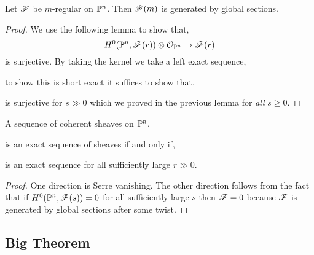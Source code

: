 \documentclass[12pt]{article}
\begin{document}
\begin{prop}
Let $\F$ be $m$-regular on $\P^n$. Then $\F(m)$ is generated by global sections.
\end{prop}

\begin{proof}
We use the following lemma to show that,
\[ H^0(\P^n, \F(r)) \ot \struct{\P^n} \to \F(r) \]
is surjective. By taking the kernel we take a left exact sequence,
\begin{center}
\end{center}
to show this is short exact it suffices to show that,
\begin{center}
\end{center}
is surjective for $s \gg 0$ which we proved in the previous lemma for \textit{all} $s \ge 0$. 
\end{proof}

\begin{lemma}
A sequence of coherent sheaves on $\P^n$,
\begin{center}
\end{center}
is an exact sequence of sheaves if and only if,
\begin{center}
\end{center}
is an exact sequence for all sufficiently large $r \gg 0$.
\end{lemma}

\begin{proof}
One direction is Serre vanishing. The other direction follows from the fact that if $H^0(\P^n, \F(s)) = 0$ for all sufficiently large $s$ then $\F = 0$ because $\F$ is generated by global sections after some twist. 
\end{proof}

\subsection{Big Theorem}
\end{document}
